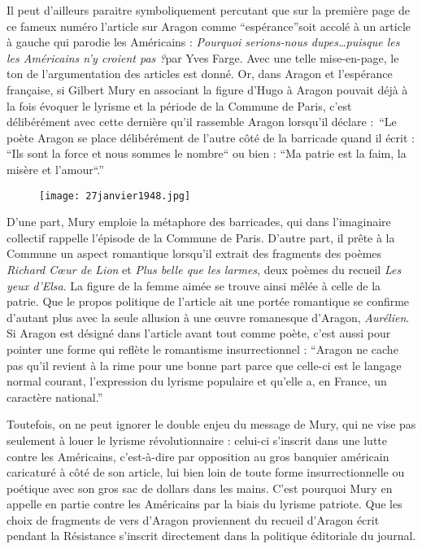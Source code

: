 Il peut d’ailleurs paraitre symboliquement percutant que sur la première page de ce fameux numéro l’article sur Aragon comme \enquote{espérance}soit accolé à un article à gauche qui parodie les Américains : \emph{Pourquoi serions-nous dupes…puisque les les Américains n’y croient pas ?}par Yves Farge. Avec une telle mise-en-page, le ton de l’argumentation des articles est donné. Or, dans Aragon et l’espérance française, si Gilbert Mury en associant la figure d’Hugo à Aragon pouvait déjà à la fois évoquer le lyrisme et la période de la Commune de Paris, c’est délibérément avec cette dernière qu’il rassemble Aragon lorsqu’il déclare : \enquote{Le poète Aragon se place délibérément de l’autre côté de la barricade quand il écrit : “Ils sont la force et nous sommes le nombre“ ou bien : “Ma patrie est la faim, la misère et l’amour“.}


\begin{figure}[H]
   \centering
   \texttt{[image: 27janvier1948.jpg]}
	\caption{\cite{journallimbour}}\label{fig:}
\end{figure}


	D’une part, Mury emploie la métaphore des barricades, qui dans l’imaginaire collectif rappelle l’épisode de la Commune de Paris. D’autre part, il prête à la Commune un aspect romantique lorsqu’il extrait des fragments des poèmes \emph{Richard C\oe{}ur de Lion} et \emph{Plus belle que les larmes}, deux poèmes du recueil \emph{Les yeux d’Elsa}. La figure de la femme aimée se trouve ainsi mêlée à  celle de la patrie. Que le propos politique de l’article ait une portée romantique se confirme d’autant plus avec la seule allusion à une \oe{}uvre romanesque d’Aragon, \emph{Aurélien}. Si Aragon est désigné dans l’article avant tout comme poète, c’est aussi pour pointer une forme qui reflète le romantisme insurrectionnel : \enquote{Aragon ne cache pas qu’il revient à la rime pour une bonne part parce que celle-ci est le langage normal courant, l’expression du lyrisme populaire et qu’elle a, en France, un caractère national.}

	Toutefois, on ne peut ignorer le double enjeu du message de Mury, qui ne vise pas seulement à louer le lyrisme révolutionnaire : celui-ci s'inscrit dans une lutte contre les Américains, c’est-à-dire par opposition au gros banquier américain caricaturé à côté de son article, lui bien loin de toute forme insurrectionnelle ou poétique avec son gros sac de dollars dans les mains. C’est pourquoi Mury en appelle en partie contre les Américains par la biais du lyrisme patriote. Que les choix de fragments de vers d’Aragon proviennent du recueil d’Aragon écrit pendant la Résistance s’inscrit directement dans la politique éditoriale du journal. 

